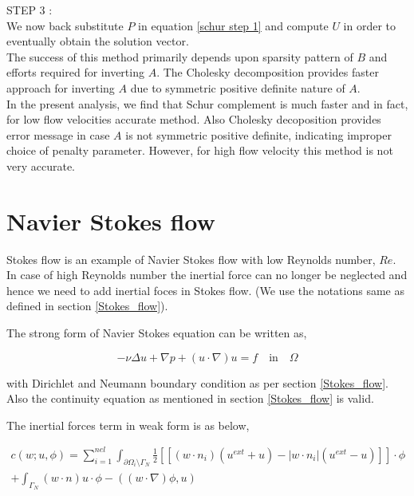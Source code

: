 \documentclass[a4paper,12pt]{book}
\begin{document}
STEP 3 : \\
We now back substitute $P$ in equation \eqref{schur step 1} and compute $U$ in order to eventually obtain the solution vector.
\\

The success of this method primarily depends upon sparsity pattern of $B$ and efforts required for inverting $A$. The Cholesky decomposition provides faster approach for inverting $A$ due to symmetric positive definite nature of $A$. \\

In the present analysis, we find that Schur complement is much faster and in fact, for low flow velocities accurate method. Also Cholesky decoposition provides error message in case $A$ is not symmetric positive definite, indicating improper choice of penalty parameter. However, for high flow velocity this method is not very accurate. 

\section{Navier Stokes flow}

Stokes flow is an example of Navier Stokes flow with low Reynolds number, $Re$. In case of high Reynolds number the inertial force can no longer be neglected and hence we need to add inertial foces in Stokes flow. (We use the notations same as defined in section \ref{Stokes_flow}).

The strong form of Navier Stokes equation can be written as,

\begin{equation} \label{navier_stokes_strong}
-\nu \Delta u + \nabla p + (u \cdot \nabla) u = f \quad \textrm{in} \quad \Omega
\end{equation}

with Dirichlet and Neumann boundary condition as per section \ref{Stokes_flow}. Also the continuity equation as mentioned in section \ref{Stokes_flow} is valid.

The inertial forces term in weak form is as below,

\begin{equation}
\begin{split}
c(w;u,\phi) = \sum_{i=1}^{nel} \int_{\partial \Omega_i \setminus \Gamma_N} \frac{1}{2} [[(w \cdot n_i)(u^{ext} + u) - |w \cdot n_i|(u^{ext} - u)]] \cdot \phi \\ + \int_{\Gamma_N} (w\cdot n) u \cdot \phi -((w\cdot \nabla)\phi,u)
\end{split}
\end{equation}
\end{document}
